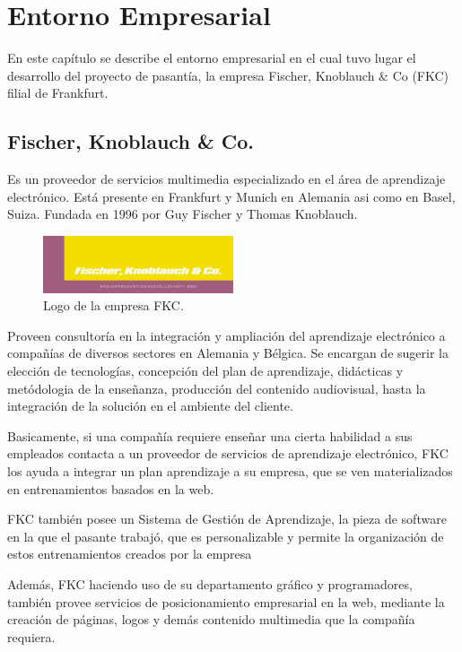\chapter{Entorno Empresarial}
\thispagestyle{empty} %

En este capítulo se describe el entorno empresarial en el cual tuvo lugar el desarrollo del proyecto de pasantía, la empresa Fischer, Knoblauch \& Co (FKC) filial de Frankfurt.
\section{Fischer, Knoblauch \& Co.}

Es un proveedor de servicios multimedia especializado en el área de aprendizaje electrónico. Está presente en Frankfurt y Munich en Alemania asi como en Basel, Suiza. Fundada en 1996 por Guy Fischer y Thomas Knoblauch.

\begin{figure}[h]
	\begin{center}
		\includegraphics[width=0.5\textwidth]{logos/logoFKC.jpg}
		\caption{Logo de la empresa FKC.} \label{fig:logoFKC}
	\end{center}
\end{figure}


Proveen consultoría en la integración y ampliación del aprendizaje electrónico a compañías de diversos sectores en Alemania y Bélgica. Se encargan de sugerir la elección de tecnologías, concepción del plan de aprendizaje, didácticas y metódologia de la enseñanza, producción del contenido audiovisual, hasta la integración de la solución en el ambiente del cliente. 

Basicamente, si una compañía requiere enseñar una cierta habilidad a sus empleados contacta a un proveedor de servicios de aprendizaje electrónico, FKC los ayuda a integrar un plan aprendizaje a su empresa, que se ven materializados en entrenamientos basados en la web. 

FKC también posee un Sistema de Gestión de Aprendizaje, la pieza de software en la que el pasante trabajó, que es personalizable y permite la organización de estos entrenamientos creados por la empresa

Además, FKC haciendo uso de su departamento gráfico y programadores, también provee servicios de posicionamiento empresarial en la web, mediante la creación de páginas, logos y demás contenido multimedia que la compañía requiera. 

